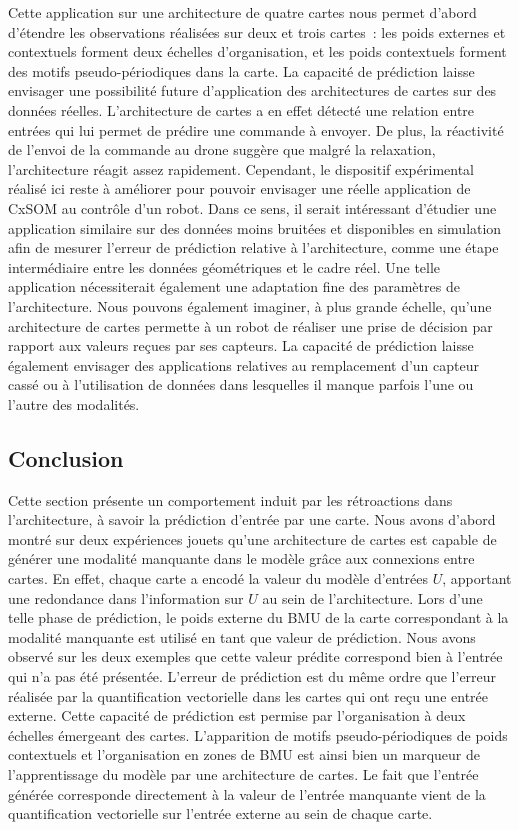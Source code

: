\documentclass[../main]{subfiles}
\begin{document}
Cette application sur une architecture de quatre cartes nous permet d'abord d'étendre les observations réalisées sur deux et trois cartes~: les poids externes et contextuels forment deux échelles d'organisation, et les poids contextuels forment des motifs pseudo-périodiques dans la carte.
La capacité de prédiction laisse envisager une possibilité future d'application des architectures de cartes sur des données réelles. 
L'architecture de cartes a en effet détecté une relation entre entrées qui lui permet de prédire une commande à envoyer. De plus, la réactivité de l'envoi de la commande au drone suggère que malgré la relaxation, l'architecture réagit assez rapidement. Cependant, le dispositif expérimental réalisé ici reste à améliorer pour pouvoir envisager une réelle application de CxSOM au contrôle d'un robot. Dans ce sens, il serait intéressant d'étudier une application similaire sur des données moins bruitées et disponibles en simulation afin de mesurer l'erreur de prédiction relative à l'architecture, comme une étape intermédiaire entre les données géométriques et le cadre réel. Une telle application nécessiterait également une adaptation fine des paramètres de l'architecture.
Nous pouvons également imaginer, à plus grande échelle, qu'une architecture de cartes permette à un robot de réaliser une prise de décision par rapport aux valeurs reçues par ses capteurs. La capacité de prédiction laisse également envisager des applications relatives au remplacement d'un capteur cassé ou à l'utilisation de données dans lesquelles il manque parfois l'une ou l'autre des modalités.

\subsection{Conclusion}

Cette section présente un comportement induit par les rétroactions dans l'architecture, à savoir la prédiction d'entrée par une carte.
Nous avons d'abord montré sur deux expériences jouets qu'une architecture de cartes est capable de générer une modalité manquante dans le modèle grâce aux connexions entre cartes. En effet, chaque carte a encodé la valeur du modèle d'entrées $U$, apportant une redondance dans l'information sur $U$ au sein de l'architecture. 
Lors d'une telle phase de prédiction, le poids externe du BMU de la carte correspondant à la modalité manquante est utilisé en tant que valeur de prédiction.
Nous avons observé sur les deux exemples que cette valeur prédite correspond bien à l'entrée qui n'a pas été présentée. L'erreur de prédiction est du même ordre que l'erreur réalisée par la quantification vectorielle dans les cartes qui ont reçu une entrée externe.
Cette capacité de prédiction est permise par l'organisation à deux échelles émergeant des cartes. L'apparition de motifs pseudo-périodiques de poids contextuels et l'organisation en zones de BMU est ainsi bien un marqueur de l'apprentissage du modèle par une architecture de cartes. 
Le fait que l'entrée générée corresponde directement à la valeur de l'entrée manquante vient de la quantification vectorielle sur l'entrée externe au sein de chaque carte.
\end{document}

